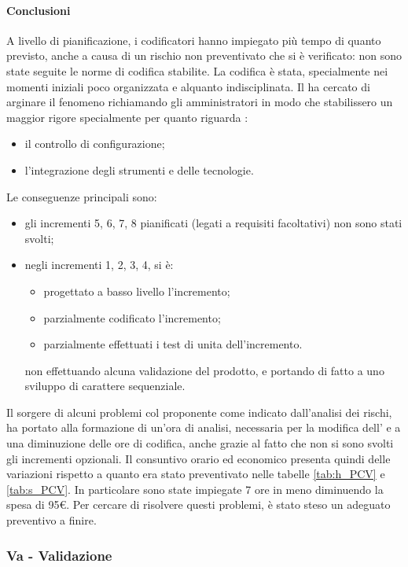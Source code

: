 	\paragraph{Conclusioni}
	A livello di pianificazione, i codificatori hanno impiegato più tempo di quanto previsto, anche a causa di un rischio non preventivato che si è verificato: non sono state seguite le norme di codifica stabilite. La codifica è stata, specialmente nei momenti iniziali poco organizzata e alquanto indisciplinata. Il \responsabile{} ha cercato di arginare il fenomeno richiamando gli amministratori in modo che stabilissero un maggior rigore specialmente per quanto riguarda :
	\begin{itemize}
		\item il controllo di configurazione;
		\item l'integrazione degli strumenti e delle tecnologie.
	\end{itemize}
	Le conseguenze principali sono:
	\begin{itemize}
		\item gli incrementi 5, 6, 7, 8 pianificati (legati a requisiti facoltativi) non sono stati svolti;
		\item negli incrementi 1, 2, 3, 4, si è:
				\begin{itemize}
					\item progettato a basso livello l'incremento;
					\item parzialmente codificato l'incremento;
					\item parzialmente effettuati i test di unita dell'incremento.
				\end{itemize}
			non effettuando alcuna validazione del prodotto, e portando di fatto a uno sviluppo di carattere sequenziale.
	\end{itemize}
	Il sorgere di alcuni problemi col proponente come indicato dall'analisi dei rischi, ha portato alla formazione di un'ora di analisi, necessaria per la modifica dell' \adr{} e a una diminuzione delle ore di codifica, anche grazie al fatto che non si sono svolti gli incrementi opzionali.
	Il consuntivo orario ed economico presenta quindi delle variazioni rispetto a quanto era stato preventivato nelle tabelle \ref{tab:h_PCV} e \ref{tab:s_PCV}. In particolare sono state impiegate 7 ore in meno diminuendo la spesa di 95€.
	Per cercare di risolvere questi problemi, è stato steso un adeguato preventivo a finire.
	\newpage
	
	
	\subsubsection{Va - Validazione}
